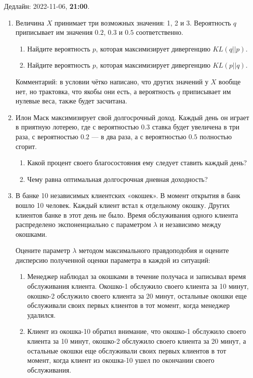 \documentclass[12pt]{article}
\begin{document}
Дедлайн: 2022-11-06, \textbf{21:00}.


\begin{enumerate}

    \item Величина $X$ принимает три возможных значения: 1, 2 и 3. 
    Вероятность $q$ приписывает им значения $0.2$, $0.3$ и $0.5$ соответственно. 
    
    \begin{enumerate}
        \item Найдите вероятность $p$, которая максимизирует дивергенцию $KL(q||p)$.
        \item Найдите вероятность $p$, которая максимизирует дивергенцию $KL(p||q)$.
    \end{enumerate}
    
Комментарий: в условии чётко написано, что других значений у $X$ вообще нет, 
но трактовка, что якобы они есть, а вероятность $q$ приписывает им нулевые веса, также будет засчитана.

\item Илон Маск максимизирует свой долгосрочный доход. 
Каждый день он играет в приятную лотерею, где с вероятностью $0.3$ ставка будет увеличена в три раза,
с вероятностью $0.2$ — в два раза, а с вероятностью $0.5$ полностью сгорит. 

\begin{enumerate}
    \item Какой процент своего благосостояния ему следует ставить каждый день?
    \item Чему равна оптимальная долгосрочная дневная доходность?
\end{enumerate}

\item В банке 10 независимых клиентских «окошек». В момент открытия в банк вошло 10 человек. Каждый
клиент встал к отдельному окошку. Других клиентов банке в этот день не было. 
Время обслуживания одного клиента распределено экспоненциально с параметром $\lambda$ 
и независимо между окошками.  

Оцените параметр $\lambda$ методом максимального правдоподобия и оцените дисперсию полученной оценки параметра в каждой из ситуаций:
\begin{enumerate}
    \item Менеджер наблюдал за окошками в течение получаса и записывал время обслуживания клиента.
    Окошко-1 обслужило своего клиента за 10 минут, окошко-2 обслужило своего клиента за 20
    минут, остальные окошки еще обслуживали своих первых клиентов в тот момент, когда менеджер
    удалился.
    \item Клиент из окошка-10 обратил внимание, что окошко-1 обслужило своего клиента за 10 минут, 
    окошко-2 обслужило своего клиента за 20
    минут, а остальные окошки еще обслуживали своих первых клиентов в тот момент, когда клиент из окошка-10 ушел по окончании своего обслуживания.
\end{enumerate}


\end{enumerate}
\end{document}
